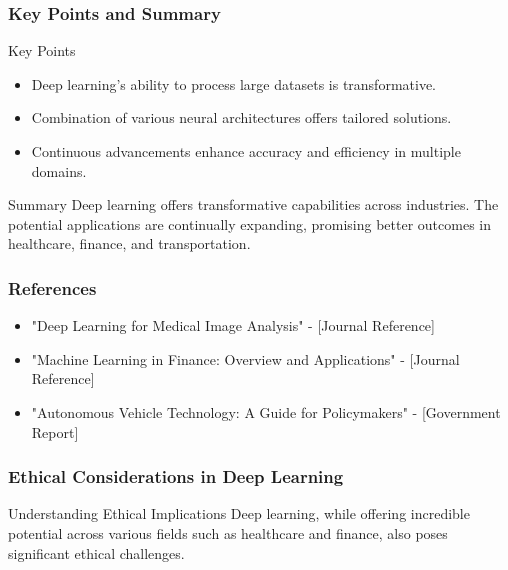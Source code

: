 \documentclass[aspectratio=169]{beamer}
\begin{document}
\begin{frame}[fragile]
    \frametitle{Key Points and Summary}
    \begin{block}{Key Points}
        \begin{itemize}
            \item Deep learning's ability to process large datasets is transformative.
            \item Combination of various neural architectures offers tailored solutions.
            \item Continuous advancements enhance accuracy and efficiency in multiple domains.
        \end{itemize}
    \end{block}

    \begin{block}{Summary}
        Deep learning offers transformative capabilities across industries. 
        The potential applications are continually expanding, promising better outcomes in healthcare, finance, and transportation.
    \end{block}
\end{frame}

\begin{frame}[fragile]
    \frametitle{References}
    \begin{itemize}
        \item "Deep Learning for Medical Image Analysis" - [Journal Reference]
        \item "Machine Learning in Finance: Overview and Applications" - [Journal Reference]
        \item "Autonomous Vehicle Technology: A Guide for Policymakers" - [Government Report]
    \end{itemize}
\end{frame}

\begin{frame}[fragile]
    \frametitle{Ethical Considerations in Deep Learning}
    \begin{block}{Understanding Ethical Implications}
        Deep learning, while offering incredible potential across various fields such as healthcare and finance, also poses significant ethical challenges. 
    \end{block}
\end{frame}
\end{document}
